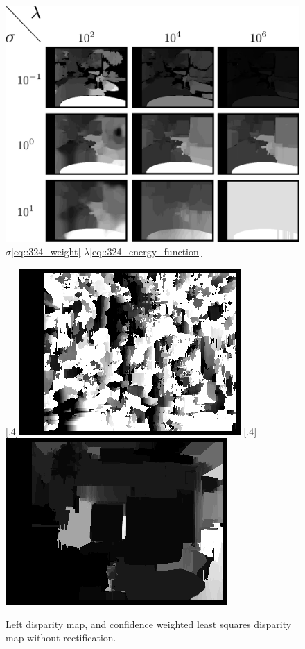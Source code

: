 \begin{figure}[h]
	\centering
	\includegraphics[scale=.28]{chapters/05_experiments/img/sigma_lambda.png}
	\caption{$\sigma$\ref{eq::324_weight} $\lambda$\ref{eq::324_energy_function}}
	\label{fig::52_sigma_lambda}
\end{figure}
\begin{figure}[h]
	\centering
	\subcaptionbox{}%
	[.4\linewidth]{\includegraphics[scale=.3]{chapters/05_experiments/img/disp_no_calib.png}}
	\subcaptionbox{}%
	[.4\linewidth]{\includegraphics[scale=.3]{chapters/05_experiments/img/wls_no_calib.png}}
	\caption{Left disparity map, and confidence weighted least squares disparity map without rectification.}
	\label{fig::52_no_calib}
\end{figure}